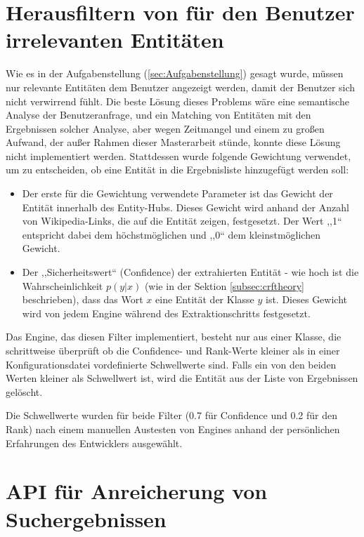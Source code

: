 \section{Herausfiltern von für den Benutzer irrelevanten Entitäten}
Wie es in der Aufgabenstellung (\ref{sec:Aufgabenstellung}) gesagt wurde, müssen nur relevante Entitäten dem Benutzer angezeigt werden, damit der Benutzer sich nicht verwirrend fühlt. Die beste Lösung dieses Problems wäre eine semantische Analyse der Benutzeranfrage, und ein Matching von Entitäten mit den Ergebnissen solcher Analyse, aber wegen Zeitmangel und einem zu großen Aufwand, der außer Rahmen dieser Masterarbeit stünde, konnte diese Lösung nicht implementiert werden. Stattdessen wurde folgende Gewichtung verwendet, um zu entscheiden, ob eine Entität in die Ergebnisliste hinzugefügt werden soll:
\begin{itemize}
\item Der erste für die Gewichtung verwendete Parameter ist das Gewicht der Entität innerhalb des Entity-Hubs. Dieses Gewicht wird anhand der Anzahl von Wikipedia-Links, die auf die Entität zeigen, festgesetzt. Der Wert ,,1`` entspricht dabei dem höchstmöglichen und ,,0`` dem kleinstmöglichen Gewicht.
\item Der ,,Sicherheitswert`` (Confidence) der extrahierten Entität - wie hoch ist die Wahrscheinlichkeit $p(y|x)$ (wie in der Sektion \ref{subsec:crftheory} beschrieben), dass das Wort $x$ eine Entität der Klasse $y$ ist. Dieses Gewicht wird von jedem Engine während des Extraktionschritts festgesetzt.
\end{itemize}

Das Engine, das diesen Filter implementiert, besteht nur aus einer Klasse, die schrittweise überprüft ob die Confidence- und Rank-Werte kleiner als in einer Konfigurationsdatei vordefinierte Schwellwerte sind. Falls ein von den beiden Werten kleiner als Schwellwert ist, wird die Entität aus der Liste von Ergebnissen gelöscht.

Die Schwellwerte wurden für beide Filter (0.7 für Confidence und 0.2 für den Rank) nach einem manuellen Austesten von Engines anhand der persönlichen Erfahrungen des Entwicklers ausgewählt.

\section{API f{\"{u}}r Anreicherung von Suchergebnissen}
